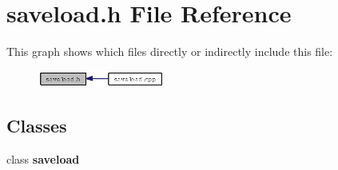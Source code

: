 \section{saveload.h File Reference}
\label{saveload_8h}


This graph shows which files directly or indirectly include this file:\begin{figure}[H]
\begin{center}
\leavevmode
\includegraphics[width=118pt]{saveload_8h__dep__incl}
\end{center}
\end{figure}
\subsection*{Classes}
\begin{CompactItemize}
\item 
class {\bf saveload}
\end{CompactItemize}
